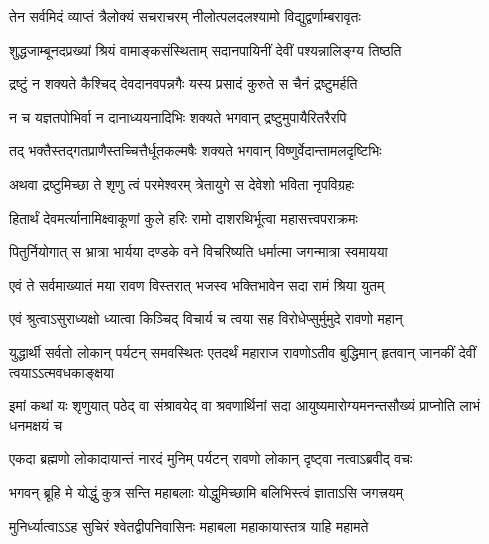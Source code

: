 \twolineshloka
{तेन सर्वमिदं व्याप्तं त्रैलोक्यं सचराचरम्}
{नीलोत्पलदलश्यामो विद्युद्वर्णाम्बरावृतः} %

\twolineshloka
{शुद्धजाम्बूनदप्रख्यां श्रियं वामाङ्कसंस्थिताम्}
{सदानपायिनीं देवीं पश्यन्नालिङ्ग्य तिष्ठति} %

\twolineshloka
{द्रष्टुं न शक्यते कैश्चिद् देवदानवपन्नगैः}
{यस्य प्रसादं कुरुते स चैनं द्रष्टुमर्हति} %

\twolineshloka
{न च यज्ञतपोभिर्वा न दानाध्ययनादिभिः}
{शक्यते भगवान् द्रष्टुमुपायैरितरैरपि} %

\twolineshloka
{तद् भक्तैस्तद्गतप्राणैस्तच्चित्तैर्धूतकल्मषैः}
{शक्यते भगवान् विष्णुर्वेदान्तामलदृष्टिभिः} %

\twolineshloka
{अथवा द्रष्टुमिच्छा ते शृणु त्वं परमेश्वरम्}
{त्रेतायुगे स देवेशो भविता नृपविग्रहः} %

\twolineshloka
{हितार्थं देवमर्त्यानामिक्ष्वाकूणां कुले हरिः}
{रामो दाशरथिर्भूत्वा महासत्त्वपराक्रमः} %

\twolineshloka
{पितुर्नियोगात् स भ्रात्रा भार्यया दण्डके वने}
{विचरिष्यति धर्मात्मा जगन्मात्रा स्वमायया} %

\twolineshloka
{एवं ते सर्वमाख्यातं मया रावण विस्तरात्}
{भजस्व भक्तिभावेन सदा रामं श्रिया युतम्} %


\twolineshloka
{एवं श्रुत्वाऽसुराध्यक्षो ध्यात्वा किञ्चिद् विचार्य च}
{त्वया सह विरोधेप्सुर्मुमुदे रावणो महान्} %

\threelineshloka
{युद्धार्थी सर्वतो लोकान् पर्यटन् समवस्थितः}
{एतदर्थं महाराज रावणोऽतीव बुद्धिमान्}
{हृतवान् जानकीं देवीं त्वयाऽऽत्मवधकाङ्क्षया} %

\fourlineindentedshloka
{इमां कथां यः शृणुयात् पठेद् वा}
{संश्रावयेद् वा श्रवणार्थिनां सदा}
{आयुष्यमारोग्यमनन्तसौख्यं}
{प्राप्नोति लाभं धनमक्षयं च} %






\twolineshloka
{एकदा ब्रह्मणो लोकादायान्तं नारदं मुनिम्}
{पर्यटन् रावणो लोकान् दृष्ट्वा नत्वाऽब्रवीद् वचः} %

\twolineshloka
{भगवन् ब्रूहि मे योद्धुं कुत्र सन्ति महाबलाः}
{योद्धुमिच्छामि बलिभिस्त्वं ज्ञाताऽसि जगत्त्रयम्} %

\twolineshloka
{मुनिर्ध्यात्वाऽऽह सुचिरं श्वेतद्वीपनिवासिनः}
{महाबला महाकायास्तत्र याहि महामते} %

